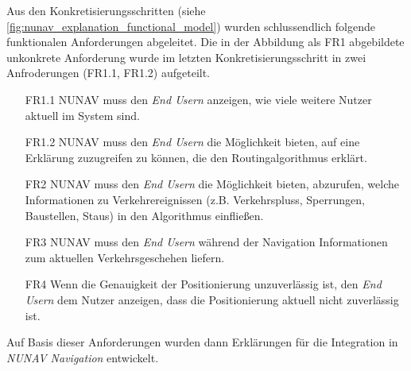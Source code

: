 Aus den Konkretisierungsschritten (siehe \autoref{fig:nunav_explanation_functional_model}) wurden schlussendlich folgende funktionalen Anforderungen abgeleitet. Die in der Abbildung als FR1 abgebildete unkonkrete Anforderung wurde im letzten Konkretisierungsschritt in zwei Anfroderungen (FR1.1, FR1.2) aufgeteilt.

\begin{enumerate}
    \item [FR1.1] NUNAV muss den \textit{End Usern} anzeigen, wie viele weitere Nutzer aktuell im System sind.
    \item [FR1.2] NUNAV muss den \textit{End Usern} die Möglichkeit bieten, auf eine Erklärung zuzugreifen zu können, die den Routingalgorithmus erklärt.
    \item [FR2] NUNAV muss den \textit{End Usern} die Möglichkeit bieten, abzurufen, welche Informationen zu Verkehrereignissen (z.B. Verkehrspluss, Sperrungen, Baustellen, Staus) in den Algorithmus einfließen.
    \item [FR3] NUNAV muss den \textit{End Usern} während der Navigation Informationen zum aktuellen Verkehrsgeschehen liefern.
    \item [FR4] Wenn die Genauigkeit der Positionierung unzuverlässig ist, den \textit{End Usern} dem Nutzer anzeigen, dass die Positionierung aktuell nicht zuverlässig ist.
\end{enumerate}

Auf Basis dieser Anforderungen wurden dann Erklärungen für die Integration in \textit{NUNAV Navigation} entwickelt.
